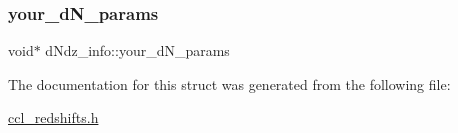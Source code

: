 \subsubsection{\texorpdfstring{your\+\_\+d\+N\+\_\+params}{your\_dN\_params}}
{\footnotesize\ttfamily void$\ast$ d\+Ndz\+\_\+info\+::your\+\_\+d\+N\+\_\+params}



The documentation for this struct was generated from the following file\+:\begin{DoxyCompactItemize}
\item 
\mbox{\hyperlink{ccl__redshifts_8h}{ccl\+\_\+redshifts.\+h}}\end{DoxyCompactItemize}
